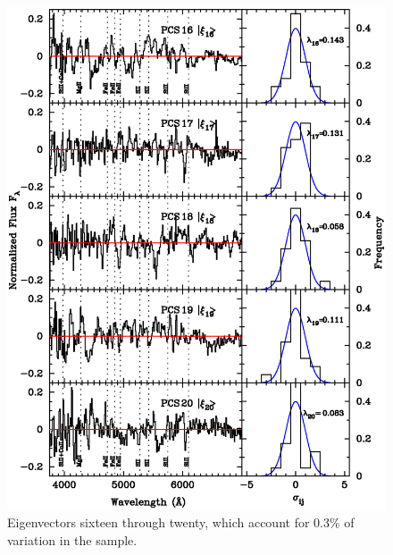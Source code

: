 \begin{figure}[htp]
\begin{center}
\includegraphics[angle=0,scale=0.8]{./figures/pca/20SNe_PCS_16to20_areanorm.ps}
\end{center}
\caption{
Eigenvectors sixteen through twenty, which account for 0.3\% of variation in the sample. 
}
\label{fig:eigen4}
\end{figure}


